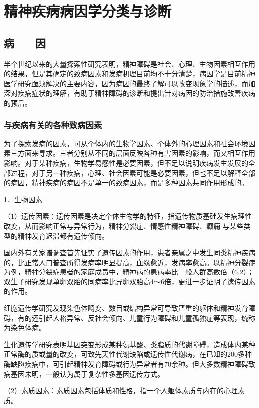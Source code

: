 \chapter{精神疾病病因学分类与诊断}

\section{病　　因}

半个世纪以来的大量探索性研究表明，精神障碍是社会、心理、生物因素相互作用的结果，但是其确定的致病因素和发病机理目前均不十分清楚，病因学是目前精神医学研究亟须解决的主要内容，因为病因的最终了解可以改变现象学的描述，而加深对疾病症状的理解，有助于精神障碍的诊断和提出针对病因的防治措施改善疾病的预后。

\subsection{与疾病有关的各种致病因素}

为了探索发病的因素，可从个体内的生物学因素、个体外的心理因素和社会环境因素三方面来寻求。三者分别从不同的层面反映各种有害因素的影响，而又相互作用影响。对于某种疾病，生物学易感性是必要因素，但不足以说明疾病发生发展的全部过程，对于另一种疾病，心理、社会因素可能是必要因素，但也不足以解释全部的病因，精神疾病的病因不是单一的致病因素，而是多种因素共同作用形成的。

1．生物因素

（1）遗传因素：遗传因素是决定个体生物学的特征，指遗传物质基础发生病理性改变，从而影响正常与异常行为，精神分裂症、情感性精神障碍、癫痫
与某些类型的精神发育迟滞都有遗传倾向。

国内外有关家谱调查首先证实了遗传因素的作用，患者亲属之中发生同类精神疾病的，比正常人口普查所得发病率明显提高，血缘愈近，发病率愈高。以精神分裂症为例，精神分裂症患者的家庭成员中，精神病的患病率比一般人群高数倍（6.2）；双生子研究发现单卵双胎的同病率比异卵双胎高4～6倍，更进一步证明了遗传因素的作用。

细胞遗传学研究发现染色体畸变、数目或结构异常可导致严重的躯体和精神发育障碍，有的还引起人格异常、反社会倾向、儿童行为障碍和儿童孤独症等表现，统称为染色体病。

生化遗传学研究表明基因突变形成某种氨基酸、类脂质的代谢障碍，造成体内某种正常酶的质或量的改变，可致先天性代谢缺陷或遗传性代谢病，在已知的200多种酶缺陷疾病中，可引起精神发育障碍或行为异常者有70余种。但大多数精神障碍致病基因未明，一般认为属于复杂性多基因遗传方式。

（2）素质因素：素质因素包括体质和性格，指一个人躯体素质与内在的心理素质。

